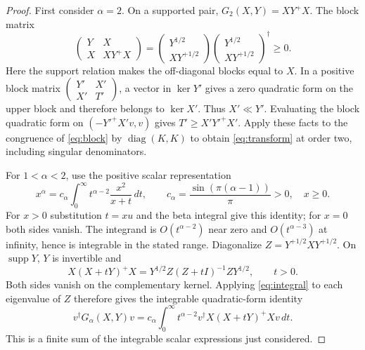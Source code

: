 \documentclass[11pt]{article}
\newcommand{\supp}{\operatorname{supp}}
\newcommand{\G}{G_\alpha}
\theoremstyle{remark}
\begin{document}
\begin{proof}
First consider $\alpha=2$. On a supported pair,
$G_2(X,Y)=XY^+X$. The block matrix
\begin{equation}\label{eq:block}
 \begin{pmatrix}Y&X\\X&XY^+X\end{pmatrix}
 =\begin{pmatrix}Y^{1/2}\\XY^{+1/2}\end{pmatrix}
  \begin{pmatrix}Y^{1/2}\\XY^{+1/2}\end{pmatrix}^{\!\dagger}
 \geq0.
\end{equation}
Here the support relation makes the off-diagonal blocks equal to $X$.
In a positive block matrix $\left(\begin{smallmatrix}Y'&X'\\X'&T'\end{smallmatrix}\right)$,
a vector in $\ker Y'$ gives a zero quadratic form on the upper block and
therefore belongs to $\ker X'$. Thus $X'\ll Y'$. Evaluating the block
quadratic form on $(-Y'^+X'v,v)$ gives $T'\geq X'Y'^+X'$.
Apply these facts to the congruence of \eqref{eq:block} by
$\operatorname{diag}(K,K)$ to obtain \eqref{eq:transform} at order two,
including singular denominators.

For $1<\alpha<2$, use the positive scalar representation
\begin{equation}\label{eq:integral}
 x^\alpha=c_\alpha\int_0^\infty t^{\alpha-2}\frac{x^2}{x+t}\,dt,
 \qquad c_\alpha=\frac{\sin(\pi(\alpha-1))}{\pi}>0,\quad x\geq0.
\end{equation}
For $x>0$ substitution $t=xu$ and the beta integral give this identity; for
$x=0$ both sides vanish. The integrand is $O(t^{\alpha-2})$ near zero and
$O(t^{\alpha-3})$ at infinity, hence is integrable in the stated range.
Diagonalize $Z=Y^{+1/2}XY^{+1/2}$. On $\supp Y$, $Y$ is invertible and
\[
 X(X+tY)^+X=Y^{1/2}Z(Z+tI)^{-1}ZY^{1/2},\qquad t>0.
\]
Both sides vanish on the complementary kernel. Applying
\eqref{eq:integral} to each eigenvalue of $Z$ therefore gives the integrable
quadratic-form identity
\begin{equation}\label{eq:matrixintegral}
 v^\dagger\G(X,Y)v
 =c_\alpha\int_0^\infty t^{\alpha-2}
                v^\dagger X(X+tY)^+Xv\,dt.
\end{equation}
This is a finite sum of the integrable scalar expressions just considered.


\end{proof}
\end{document}

